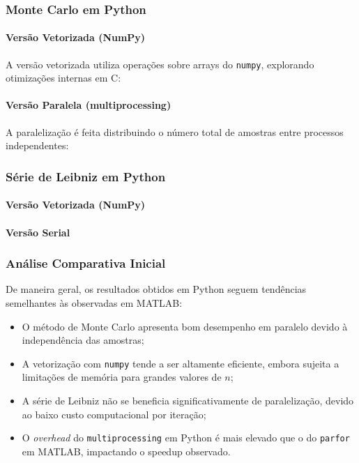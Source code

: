 \documentclass[12pt, a4paper]{article}
\begin{document}
	\subsubsection{Monte Carlo em Python}
	
	\paragraph{Versão Vetorizada (NumPy)}
	
	A versão vetorizada utiliza operações sobre arrays do \texttt{numpy},
	explorando otimizações internas em C:
	

	
	\paragraph{Versão Paralela (multiprocessing)}
	
	A paralelização é feita distribuindo o número total de amostras entre
	processos independentes:
	

	
	\subsubsection{Série de Leibniz em Python}
	
	\paragraph{Versão Vetorizada (NumPy)}
	

	
	\paragraph{Versão Serial}
	
	
	
	\subsubsection{Análise Comparativa Inicial}
	
	De maneira geral, os resultados obtidos em Python seguem tendências
	semelhantes às observadas em MATLAB:
	
	\begin{itemize}
		\item O método de Monte Carlo apresenta bom desempenho em paralelo
		devido à independência das amostras;
		\item A vetorização com \texttt{numpy} tende a ser altamente eficiente,
		embora sujeita a limitações de memória para grandes valores de $n$;
		\item A série de Leibniz não se beneficia significativamente de
		paralelização, devido ao baixo custo computacional por iteração;
		\item O \textit{overhead} do \texttt{multiprocessing} em Python é mais
		elevado que o do \texttt{parfor} em MATLAB, impactando o speedup observado.
	\end{itemize}
	
\end{document}
